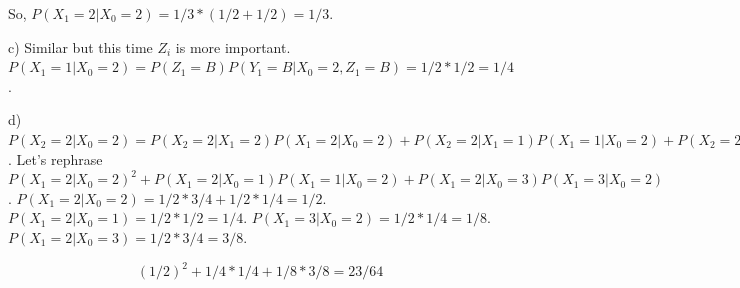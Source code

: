\documentclass[]{book}
\theoremstyle{definition}
\theoremstyle{definition}
\theoremstyle{definition}
\theoremstyle{remark}
\begin{document}
So, \(P(X_1 = 2 | X_0 = 2) = 1/3*(1/2 + 1/2) = 1/3\).

c) Similar but this time \(Z_i\) is more important.
\(P(X_1 = 1 | X_0 = 2) = P(Z_1 = B)P(Y_1 = B|X_0=2,Z_1=B) = 1/2*1/2=1/4\).

d)
\(P(X_2 = 2 | X_0 = 2) = P(X_2 = 2 | X_1 = 2)P(X_1 = 2 | X_0 = 2) + P(X_2 = 2 | X_1 = 1)P(X_1 = 1 | X_0 = 2) + P(X_2 = 2 | X_1 = 3)P(X_1 = 3 | X_0 = 2)\).
Let's rephrase
\(P(X_1 = 2 | X_0 = 2)^2 + P(X_1 = 2 | X_0 = 1)P(X_1 = 1 | X_0 = 2) + P(X_1 = 2 | X_0 = 3)P(X_1 = 3 | X_0 = 2)\).
\(P(X_1 = 2 | X_0 = 2) = 1/2*3/4 + 1/2*1/4 = 1/2\).
\(P(X_1 = 2|X_0 = 1) = 1/2*1/2 = 1/4\).
\(P(X_1 = 3|X_0 = 2) = 1/2*1/4 = 1/8\).
\(P(X_1 = 2|X_0 = 3) = 1/2*3/4 = 3/8\).

\[(1/2)^2 + 1/4 * 1/4 + 1/8*3/8 = 23/64\]


\end{document}
